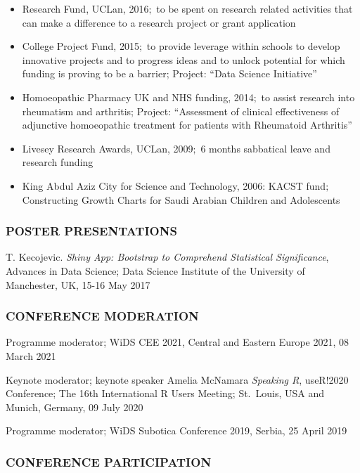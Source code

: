 \documentclass[
]{article}
\providecommand{\tightlist}{%
  \setlength{\itemsep}{0pt}\setlength{\parskip}{0pt}}
\begin{document}
\begin{itemize}
\tightlist
\item
  Research Fund, UCLan, 2016\(;\) to be spent on research related
  activities that can make a difference to a research project or grant
  application
\item
  College Project Fund, 2015\(;\) to provide leverage within schools to
  develop innovative projects and to progress ideas and to unlock
  potential for which funding is proving to be a barrier; Project:
  ``Data Science Initiative''
\item
  Homoeopathic Pharmacy UK and NHS funding, 2014\(;\) to assist research
  into rheumatism and arthritis; Project: ``Assessment of clinical
  effectiveness of adjunctive homoeopathic treatment for patients with
  Rheumatoid Arthritis''
\item
  Livesey Research Awards, UCLan, 2009\(;\) 6 months sabbatical leave
  and research funding
\item
  King Abdul Aziz City for Science and Technology, 2006: KACST fund\(;\)
  Constructing Growth Charts for Saudi Arabian Children and Adolescents
\end{itemize}

\hypertarget{poster-presentations}{%
\subsubsection{POSTER PRESENTATIONS}\label{poster-presentations}}

T. Kecojevic. \emph{Shiny App: Bootstrap to Comprehend Statistical
Significance}, Advances in Data Science; Data Science Institute of the
University of Manchester, UK, 15-16 May 2017

\hypertarget{conference-moderation}{%
\subsubsection{CONFERENCE MODERATION}\label{conference-moderation}}

Programme moderator; WiDS CEE 2021, Central and Eastern Europe 2021, 08
March 2021

Keynote moderator; keynote speaker Amelia McNamara \emph{Speaking R},
useR!2020 Conference; The 16th International R Users Meeting; St.~Louis,
USA and Munich, Germany, 09 July 2020

Programme moderator; WiDS Subotica Conference 2019, Serbia, 25 April
2019

\hypertarget{conference-participation}{%
\subsubsection{CONFERENCE
PARTICIPATION}\label{conference-participation}}
\end{document}
